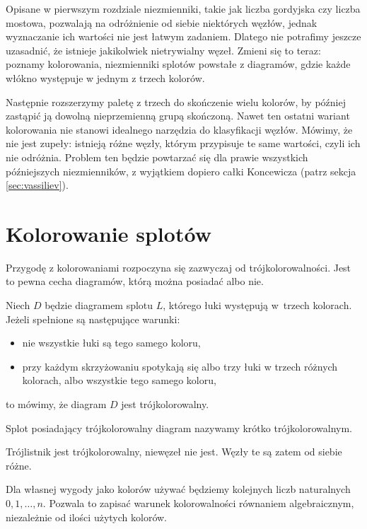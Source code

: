 Opisane w pierwszym rozdziale niezmienniki, takie jak liczba gordyjska czy liczba mostowa, pozwalają na odróżnienie od siebie niektórych węzłów, jednak wyznaczanie ich wartości nie jest łatwym zadaniem.
Dlatego nie potrafimy jeszcze uzasadnić, że istnieje jakikolwiek nietrywialny węzeł.
Zmieni się to teraz: poznamy kolorowania, niezmienniki splotów powstałe z diagramów, gdzie każde włókno występuje w jednym z trzech kolorów.

Następnie rozszerzymy paletę z trzech do skończenie wielu kolorów, by później zastąpić ją dowolną nieprzemienną grupą skończoną.
Nawet ten ostatni wariant kolorowania nie stanowi idealnego narzędzia do klasyfikacji węzłów.
Mówimy, że nie jest zupeły: istnieją różne węzły, którym przypisuje te same wartości, czyli ich nie odróżnia.
Problem ten będzie powtarzać się dla prawie wszystkich późniejszych niezmienników, z wyjątkiem dopiero całki Koncewicza (patrz sekcja \ref{sec:vassiliev}).

\section{Kolorowanie splotów} %

Przygodę z kolorowaniami rozpoczyna się zazwyczaj od trójkolorowalności.
Jest to pewna cecha diagramów, którą można posiadać albo nie.

\begin{definition}[trójkolorowalność]
    Niech $D$ będzie diagramem splotu $L$, którego łuki występują w~trzech kolorach.
    Jeżeli spełnione są następujące warunki:
    \begin{itemize}[leftmargin=*]
        \item nie wszystkie łuki są tego samego koloru,
        \item przy każdym skrzyżowaniu spotykają się albo trzy łuki w trzech różnych kolorach, albo wszystkie tego samego koloru,
    \end{itemize}
    to mówimy, że diagram $D$ jest trójkolorowalny.
\end{definition}

 Splot posiadający trójkolorowalny diagram nazywamy krótko trójkolorowalnym.

\begin{example}
    Trójlistnik jest trójkolorowalny, niewęzeł nie jest.
    Węzły te są zatem od siebie różne.
\end{example}

Dla własnej wygody jako kolorów używać będziemy kolejnych liczb naturalnych $0, 1, \ldots, n$.
Pozwala to zapisać warunek kolorowalności równaniem algebraicznym, niezależnie od ilości użytych kolorów.


